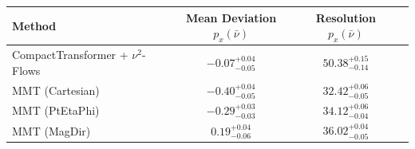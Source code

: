     \begin{tabular}{lccc}
        \toprule
        Method & Mean Deviation $p_{x}(\bar{\nu})$ & Resolution $p_{x}(\bar{\nu})$ \\
        \midrule
        CompactTransformer + $\nu^2$-Flows & $-0.07^{+0.04}_{-0.05}$ & $50.38^{+0.15}_{-0.14}$ \\
        MMT (Cartesian) & $-0.40^{+0.04}_{-0.05}$ & $32.42^{+0.06}_{-0.05}$ \\
        MMT (PtEtaPhi) & $-0.29^{+0.03}_{-0.03}$ & $34.12^{+0.06}_{-0.04}$ \\
        MMT (MagDir) & $0.19^{+0.04}_{-0.06}$ & $36.02^{+0.04}_{-0.05}$ \\
        \bottomrule
    \end{tabular}